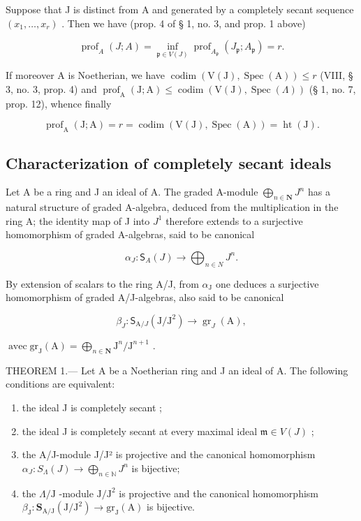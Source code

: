 Suppose that J is distinct from A and generated by a completely secant sequence \((x_{1},\ldots,x_{r})\) . Then we have (prop. 4 of § 1, no. 3, and prop. 1 above)

\[
\operatorname{prof} _ {A} (J; A) = \inf _ {\mathfrak {p} \in V (J)} \operatorname{prof} _ {A _ {\mathfrak {p}}} (J _ {\mathfrak {p}}; A _ {\mathfrak {p}}) = r.
\]

If moreover A is Noetherian, we have \(\operatorname{codim}(\mathrm{V}(\mathrm{J}),\operatorname{Spec}(\mathrm{A}))\leqslant r\) (VIII, § 3, no. 3, prop. 4) and \(\operatorname{prof}_{\mathrm{A}}(\mathrm{J};\mathrm{A})\leqslant \operatorname{codim}(\mathrm{V}(\mathrm{J}),\operatorname{Spec}(\Lambda))\) (§ 1, no. 7, prop. 12), whence finally

\[
\operatorname{prof} _ {\mathrm{A}} (\mathrm{J}; \mathrm{A}) = r = \operatorname{codim} (\mathrm{V} (\mathrm{J}), \operatorname{Spec} (\mathrm{A})) = \operatorname{ht} (\mathrm{J}).
\]

\subsection{Characterization of completely secant ideals}

Let A be a ring and J an ideal of A. The graded A-module \(\bigoplus_{n\in\mathbf{N}}J^{n}\) has a natural structure of graded A-algebra, deduced from the multiplication in the ring A; the identity map of J into \(J^{1}\) therefore extends to a surjective homomorphism of graded A-algebras, said to be canonical

\[
\alpha_ {J}: \mathsf {S} _ {A} (J) \longrightarrow \bigoplus_ {n \in N} J ^ {n}.
\]

By extension of scalars to the ring A/J, from \(\alpha_{\mathrm{J}}\) one deduces a surjective homomorphism of graded A/J-algebras, also said to be canonical

\[
\beta_ {J}: \mathsf {S} _ {\mathrm{A} / J} (\mathrm{J} / \mathrm{J} ^ {2}) \longrightarrow \operatorname{gr} _ {J} (\mathrm{A}),
\]

\(\operatorname{avec} \mathrm{gr}_{\mathrm{J}}(\mathrm{A}) = \bigoplus_{n \in \mathbf{N}} \mathrm{J}^n / \mathrm{J}^{n+1}\) .

THEOREM 1.--- Let A be a Noetherian ring and J an ideal of A. The following conditions are equivalent:

\begin{enumerate}
\def\labelenumi{(\roman{enumi})}
\item
  the ideal J is completely secant ;
\item
  the ideal J is completely secant at every maximal ideal \(\mathfrak{m} \in V(J)\) ;
\item
  the A/J-module J/J² is projective and the canonical homomorphism \(\alpha_{J}: S_{\Lambda}(J) \longrightarrow \bigoplus_{n \in \mathbb{N}} J^{n}\) is bijective;
\item
  the \(\Lambda/\mathrm{J}\) -module \(\mathrm{J}/\mathrm{J}^2\) is projective and the canonical homomorphism \(\beta_{\mathrm{J}}:\mathbf{S}_{\mathrm{A}/\mathrm{J}}(\mathrm{J}/\mathrm{J}^2)\longrightarrow\mathrm{gr}_{\mathrm{J}}(\mathrm{A})\) is bijective.
\end{enumerate}

